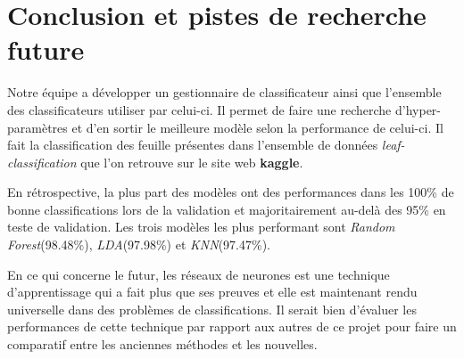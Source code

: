 \section{Conclusion et pistes de recherche future}
Notre équipe a développer un gestionnaire de classificateur ainsi que l'ensemble des classificateurs utiliser par celui-ci. Il permet de faire une recherche d'hyper-paramètres et d'en sortir le meilleure modèle selon la performance de celui-ci. Il fait la classification des feuille présentes dans l'ensemble de données \emph{leaf-classification} que l'on retrouve sur le site web \textbf{kaggle}.

En rétrospective, la plus part des modèles ont des performances dans les 100\% de bonne classifications lors de la validation et majoritairement au-delà des 95\% en teste de validation. Les trois modèles les plus performant sont \emph{Random Forest}(98.48\%), \emph{LDA}(97.98\%) et \emph{KNN}(97.47\%).

En ce qui concerne le futur, les réseaux de neurones est une technique d'apprentissage qui a fait plus que ses preuves et elle est maintenant rendu universelle dans des problèmes de classifications. Il serait bien d'évaluer les performances de cette technique par rapport aux autres de ce projet pour faire un comparatif entre les anciennes méthodes et les nouvelles.